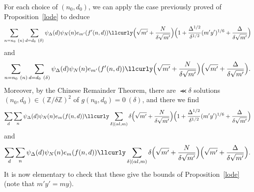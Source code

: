 \documentclass[12pt,a4paper,reqno]{amsart}
\numberwithin{equation}{section}
\theoremstyle{plain}
\theoremstyle{definition}
\newcommand\Z{\mathbb{Z}}
\renewcommand{\lessapprox}{\llcurly}
\begin{document}
For each choice of $(n_0,d_0)$, we can apply the case previously
proved of Proposition~\ref{lode} to deduce
$$
\sum_{n=n_0\ (n)} \sum_{d=d_0\ (\delta)}\psi_{\Delta}(d)\psi_N(n)
e_{m'}(f'(n,d)) \lessapprox \Bigl(\sqrt{m'} +
\frac{N}{\delta\sqrt{m'}}\Bigr) \Bigl( 1 +
\frac{\Delta^{1/2}}{\delta^{1/2}} (m'y')^{1/6} +
\frac{\Delta}{\delta \sqrt{m'}}\Bigr)
$$ 
and
$$
\sum_{n=n_0\ (n)} \sum_{d=d_0\ (\delta)}\psi_{\Delta}(d)\psi_N(n)
e_{m'}(f'(n,d)) \lessapprox
\Bigl(\sqrt{m'} +
\frac{N}{\delta\sqrt{m'}}\Bigr) \Bigl( \sqrt{m'}+
\frac{\Delta}{\delta \sqrt{m'}}\Bigr).
$$
Moreover, by the Chinese Remainder Theorem, there are $\lessapprox
\delta$ solutions $(n_0,d_0)\in(\Z/\delta\Z)^2$ of $g(n_0,d_0)=0\
(\delta)$, and there we find
$$
\sum_d \sum_n \psi_{\Delta}(d) \psi_N(n) e_m(f(n,d))
\lessapprox
\sum_{\delta\mid (\alpha l,m)}\delta 
\Bigl(\sqrt{m'} +
\frac{N}{\delta\sqrt{m'}}\Bigr) \Bigl( 1 +
\frac{\Delta^{1/2}}{\delta^{1/2}} (m'y')^{1/6} +
\frac{\Delta}{\delta \sqrt{m'}}\Bigr)
$$
and
$$
\sum_d \sum_n \psi_{\Delta}(d) \psi_N(n) e_m(f(n,d))
\lessapprox
\sum_{\delta\mid (\alpha l,m)}\delta 
\Bigl(\sqrt{m'} +
\frac{N}{\delta\sqrt{m'}}\Bigr) \Bigl( \sqrt{m'}+
\frac{\Delta}{\delta \sqrt{m'}}\Bigr).
$$
It is now elementary to check that these give the bounds of
Proposition~\ref{lode} (note that $m'y'=my$).


\end{document}
